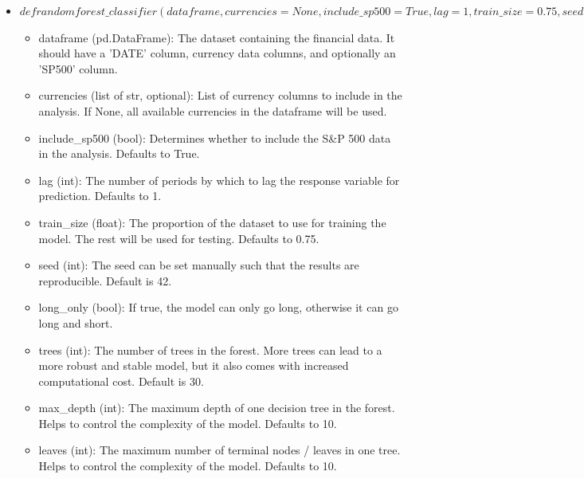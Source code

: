 \begin{itemize}
\begin{itemize}
        \item seed (int): The seed can be set manually such that the results are reproducible. Default is 42.
        \item long\_only (bool): If true, the model can only go long, otherwise it can go long and short.
        \item max\_depth (int): The maximum depth of the decision tree. Helps to control the complexity of the model. Defaults to 10.
    \end{itemize}
    \item $def randomforest\_classifier(dataframe, currencies=None, include\_sp500=True, lag=1, train\_size=0.75, seed=42, long\_only=False, trees=30, max\_depth=10, leaves=10):$
    \begin{itemize}
        \item dataframe (pd.DataFrame): The dataset containing the financial data. It should have a 'DATE' column, currency data columns, and optionally an 'SP500' column.
        \item currencies (list of str, optional): List of currency columns to include in the analysis. If None, all available currencies in the dataframe will be used.
        \item include\_sp500 (bool): Determines whether to include the S\&P 500 data in the analysis. Defaults to True.
        \item lag (int): The number of periods by which to lag the response variable for prediction. Defaults to 1.
        \item train\_size (float): The proportion of the dataset to use for training the model. The rest will be used for testing. Defaults to 0.75.
        \item seed (int): The seed can be set manually such that the results are reproducible. Default is 42.
        \item long\_only (bool): If true, the model can only go long, otherwise it can go long and short.
        \item trees (int): The number of trees in the forest. More trees can lead to a more robust and stable model, but it also comes with increased computational cost. Default is 30.
        \item max\_depth (int): The maximum depth of one decision tree in the forest. Helps to control the complexity of the model. Defaults to 10.
        \item leaves (int): The maximum number of terminal nodes / leaves in one tree. Helps to control the complexity of the model. Defaults to 10.
    \end{itemize}
\end{itemize}

